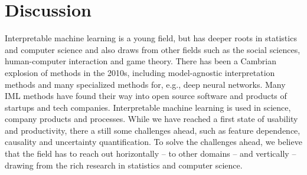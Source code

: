 \documentclass[runningheads]{llncs}
\begin{document}
\section{Discussion}

Interpretable machine learning is a young field, but has deeper roots in statistics and computer science and also draws from other fields such as the social sciences, human-computer interaction and game theory.
There has been a Cambrian explosion of methods in the 2010s, including model-agnostic interpretation methods and many specialized methods for, e.g., deep neural networks.
Many IML methods have found their way into open source software and products of startups and tech companies.
Interpretable machine learning is used in science, company products and processes.
While we have reached a first state of usability and productivity, there a still some challenges ahead, such as feature dependence, causality and uncertainty quantification.
To solve the challenges ahead, we believe that the field has to reach out horizontally -- to other domains -- and vertically -- drawing from the rich research in statistics and computer science.


%
%
%
% 
%

\vskip 0.2in


\end{document}
